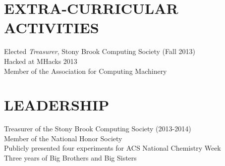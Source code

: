 \documentclass[margin]{res}
\begin{document}
\begin{resume}
\section{EXTRA-CURRICULAR \\ ACTIVITIES}             
            Elected {\it Treasurer}, Stony Brook Computing Society (Fall 2013) \\
            Hacked at MHacks 2013 \\
            Member of the Association for Computing Machinery
 
\section{LEADERSHIP}

            Treasurer of the Stony Brook Computing Society (2013-2014)\\
            Member of the National Honor Society \\
            Publicly presented four experiments for ACS National Chemistry Week \\
            Three years of Big Brothers and Big Sisters

\end{resume}
\end{document}
